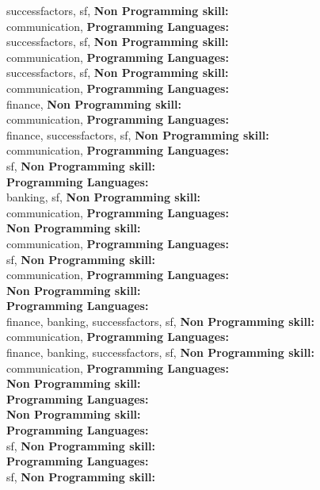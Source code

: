 successfactors, sf, \textbf{Non Programming skill:} \\
communication, \textbf{Programming Languages:} \\
successfactors, sf, \textbf{Non Programming skill:} \\
communication, \textbf{Programming Languages:} \\
successfactors, sf, \textbf{Non Programming skill:} \\
communication, \textbf{Programming Languages:} \\
finance, \textbf{Non Programming skill:} \\
communication, \textbf{Programming Languages:} \\
finance, successfactors, sf, \textbf{Non Programming skill:} \\
communication, \textbf{Programming Languages:} \\
sf, \textbf{Non Programming skill:} \\
\textbf{Programming Languages:} \\
banking, sf, \textbf{Non Programming skill:} \\
communication, \textbf{Programming Languages:} \\
\textbf{Non Programming skill:} \\
communication, \textbf{Programming Languages:} \\
sf, \textbf{Non Programming skill:} \\
communication, \textbf{Programming Languages:} \\
\textbf{Non Programming skill:} \\
\textbf{Programming Languages:} \\
finance, banking, successfactors, sf, \textbf{Non Programming skill:} \\
communication, \textbf{Programming Languages:} \\
finance, banking, successfactors, sf, \textbf{Non Programming skill:} \\
communication, \textbf{Programming Languages:} \\
\textbf{Non Programming skill:} \\
\textbf{Programming Languages:} \\
\textbf{Non Programming skill:} \\
\textbf{Programming Languages:} \\
sf, \textbf{Non Programming skill:} \\
\textbf{Programming Languages:} \\
sf, \textbf{Non Programming skill:} \\
